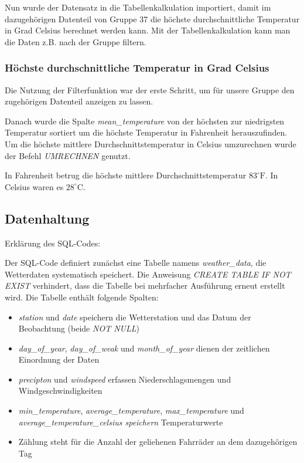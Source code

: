 \documentclass{article}
\begin{document}
Nun wurde der Datensatz in die Tabellenkalkulation importiert, damit im dazugehörigen Datenteil von Gruppe 37 die höchste durchschnittliche Temperatur in Grad Celsius berechnet werden kann. Mit der Tabellenkalkulation kann man die Daten z.B. nach der Gruppe filtern.

\subsubsection{Höchste durchschnittliche Temperatur in Grad Celsius}
Die Nutzung der Filterfunktion war der erste Schritt, um für unsere Gruppe den zugehörigen Datenteil anzeigen zu lassen.

Danach wurde die Spalte \textit{mean\_temperature} von der höchsten zur niedrigsten Temperatur sortiert um die höchste Temperatur in Fahrenheit herauszufinden. Um die höchste mittlere Durchschnittstemperatur in Celsius umzurechnen wurde der Befehl \textit{UMRECHNEN} genutzt.

In Fahrenheit betrug die höchste mittlere Durchschnittstemperatur $83^\circ\text{F}$. In Celsius waren es $28^\circ\text{C}$.


\newpage

\subsection{Datenhaltung}
Erklärung des SQL-Codes:

Der SQL-Code definiert zunächst eine Tabelle namens \textit{weather\_data}, die Wetterdaten systematisch speichert. Die Anweisung \textit{CREATE TABLE IF NOT EXIST} verhindert, dass die Tabelle bei mehrfacher Ausführung erneut erstellt wird. Die Tabelle enthält folgende Spalten:


\begin{itemize}
    \item \textit{station} und \textit{date} speichern die Wetterstation und das Datum der Beobachtung (beide \textit{NOT NULL}) 
    \item \textit{day\_of\_year}, \textit{day\_of\_weak} und \textit{month\_of\_year} dienen der zeitlichen Einordnung der Daten 
    \item \textit{precipton} und \textit{windspeed} erfassen Niederschlagsmengen und Windgeschwindigkeiten
    \item \textit{min\_temperature}, \textit{average\_temperature}, \textit{max\_temperature} und \textit{average\_temperature\_celsius speichern} Temperaturwerte
    \item Zählung steht für die Anzahl der geliehenen Fahrräder an dem dazugehörigen Tag
\end{itemize}
\end{document}
